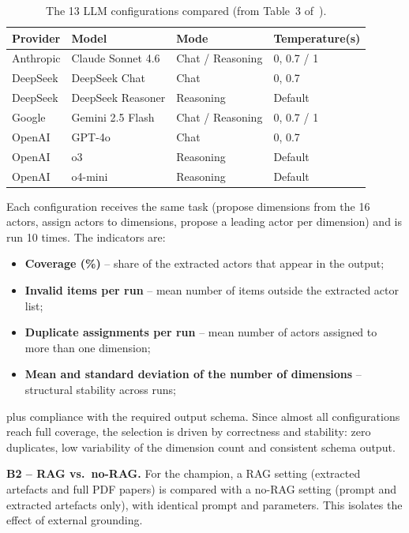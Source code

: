 \documentclass[11pt,a4paper]{article}
\begin{document}
\begin{table}[h]
\centering
\caption{The 13 LLM configurations compared (from Table~3 of~\cite{daoud2026}).}\label{tab:llmconf}
\small
\begin{tabular}{@{}llll@{}}
\toprule
Provider & Model & Mode & Temperature(s) \\
\midrule
Anthropic & Claude Sonnet 4.6 & Chat / Reasoning & 0, 0.7 / 1 \\
DeepSeek & DeepSeek Chat & Chat & 0, 0.7 \\
DeepSeek & DeepSeek Reasoner & Reasoning & Default \\
Google & Gemini 2.5 Flash & Chat / Reasoning & 0, 0.7 / 1 \\
OpenAI & GPT-4o & Chat & 0, 0.7 \\
OpenAI & o3 & Reasoning & Default \\
OpenAI & o4-mini & Reasoning & Default \\
\bottomrule
\end{tabular}
\end{table}

Each configuration receives the same task (propose dimensions from the 16 actors, assign actors to dimensions, propose a leading actor per dimension) and is run 10 times. The indicators are:
\begin{itemize}
  \item \textbf{Coverage (\%)} -- share of the extracted actors that appear in the output;
  \item \textbf{Invalid items per run} -- mean number of items outside the extracted actor list;
  \item \textbf{Duplicate assignments per run} -- mean number of actors assigned to more than one dimension;
  \item \textbf{Mean and standard deviation of the number of dimensions} -- structural stability across runs;
\end{itemize}
plus compliance with the required output schema. Since almost all configurations reach full coverage, the selection is driven by correctness and stability: zero duplicates, low variability of the dimension count and consistent schema output.

\textbf{B2 -- RAG vs.\ no-RAG.}
For the champion, a RAG setting (extracted artefacts and full PDF papers) is compared with a no-RAG setting (prompt and extracted artefacts only), with identical prompt and parameters. This isolates the effect of external grounding.
\end{document}
